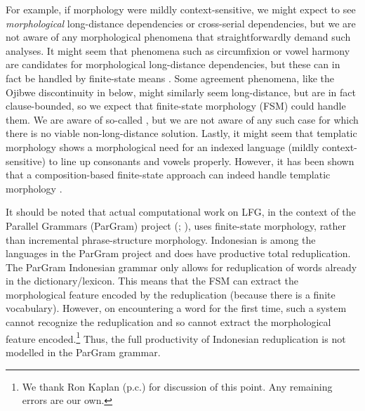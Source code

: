\documentclass[output=paper,hidelinks]{langscibook}
\begin{document}
    For example, if morphology were mildly context-sensitive, we might
    expect to see \emph{morphological} long-distance dependencies or
    cross-serial dependencies, but we are not aware of any
    morphological phenomena that straightforwardly demand such
    analyses. It might seem that phenomena such
      as circumfixion or vowel harmony are  candidates for
      morphological long-distance dependencies, but these can in fact be handled by
      finite-state means \citep{beesleykarttunen03}. Some agreement
      phenomena, like the Ojibwe  discontinuity
      in  below, might similarly seem long-distance, but
      are in fact clause-bounded, so we expect that finite-state morphology (FSM) could handle
      them. We are aware of so-called 
      \citep{butt93-bls,bhatt05-lda}, but we are not aware of any such case for which there is
      no viable non-long-distance solution. Lastly, it
      might seem that templatic morphology shows a morphological
      need for an indexed language (mildly context-sensitive) to line
      up consonants and vowels properly. However, it has been shown
      that a composition-based finite-state approach can indeed handle
      templatic morphology \citep{kiraz01,roark;sproat07}.
        
      It should be noted that actual computational work on LFG, in the
      context of the Parallel Grammars (ParGram) project
      (\citealt{ButtEtAl1999}; ), uses finite-state
      morphology, rather than incremental phrase-structure
      morphology. Indonesian is among the languages in the ParGram
      project and does have productive total reduplication. The
      ParGram Indonesian grammar only allows for reduplication of
      words already in the dictionary/lexicon. This means that the FSM
      can extract the morphological feature encoded by the
      reduplication (because there is a finite vocabulary). However,
      on encountering a word for the first time, such a system cannot
      recognize the reduplication and so cannot extract the morphological
      feature encoded.\footnote{We thank Ron Kaplan (p.c.) for
        discussion of this point. Any remaining errors are our own.}
      Thus, the full productivity of Indonesian reduplication is not
      modelled in the ParGram grammar.
  
\end{document}
